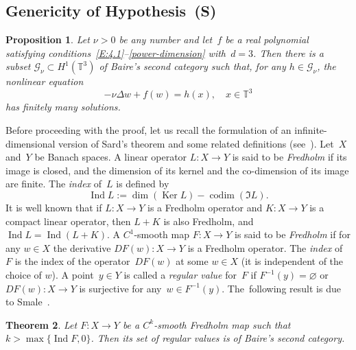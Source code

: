 \documentclass[11pt]{article}
\newcommand{\Subsection}{\subsection}
\theoremstyle{plain}
\newtheorem{theorem}{Theorem}[section]
\newtheorem{proposition}[theorem]{Proposition}
\theoremstyle{definition}
\let\mathcal\mathscr
\theoremstyle{plain}
\numberwithin{equation}{section}
\newcommand{\T}{{\mathbb T}}
\DeclareMathOperator{\Ker}{Ker}
\DeclareMathOperator{\Ind}{Ind}
\DeclareMathOperator{\codim}{codim}
\newcommand{\GG}{{\mathcal G}}
\begin{document}
\Subsection{Genericity of Hypothesis~(S)}
\label{S:5.3}

\begin{proposition}\label{P:5.3}
Let $\nu>0$ be any number and let~$f$ be a real polynomial satisfying conditions~\eqref{E:4.1}--\eqref{power-dimension} with~$d=3$. Then there is a subset $\GG_\nu\subset H^1(\T^3)$ of Baire's second category such that, for any $h\in \GG_\nu$, the nonlinear equation\vspace*{-3pt}
\begin{equation} \label{stationary-eq3}
-\nu\Delta w+f(w)=h(x), \quad x\in\T^3
\end{equation}
has finitely many solutions.
\end{proposition}

Before proceeding with the proof, let us recall the formulation of an infinite-dimensional version of Sard's theorem and some related definitions (see~\cite{smale-1965}). Let~$X$ and~$Y$ be Banach spaces. A linear operator $L:X\to Y$ is said to be \emph{Fredholm} if its image is closed, and the dimension of its kernel and the co-dimension of its image are finite. The \emph{index} of~$L$ is defined by
\[
\Ind L:= \dim (\Ker L)- \codim(\Im L).
\]
It is well known that if $L:X\to Y$ is a Fredholm operator and $K:X\to Y$ is a compact linear operator, then $L+K$ is also Fredholm, and $\Ind L=\Ind(L+K)$. A $C^1$-smooth map $F:X\to Y$ is said to be \emph{Fredholm} if for any $w\in X$ the derivative $DF(w):X\to Y$ is a Fredholm operator. The \emph{index} of~$F$ is the index of the operator~$DF(w)$ at some $w\in X$ (it is independent of the choice of $w$). A point~$y\in Y$ is called a \emph{regular value} for~$F$ if $F^{-1}(y)=\varnothing$ or $DF(w):X\to Y$ is surjective for any~$w\in F^{-1}(y)$. The~following result is due to Smale~\cite[Cor.\,1.5]{smale-1965}.

\begin{theorem}\label{T:5.4}
Let $F:X\to Y$ be a $C^k$-smooth Fredholm map such that $k>\max \{\Ind F,0\}$. Then its set of regular values is of Baire's second category.
\end{theorem}
\end{document}
